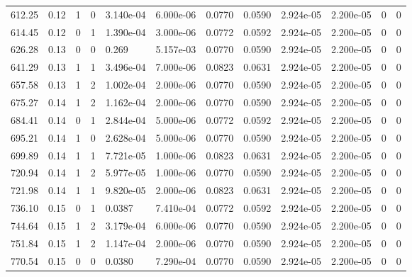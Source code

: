 \documentclass[preview]{standalone}
\begin{document}
{{\begin{tabular}{L{1.2cm}C{1.2cm} C{0.3cm}C{0.5cm} C{1.4cm}C{1.4cm} C{1.4cm}C{1.4cm} C{1.6cm}C{1.6cm} C{1.6cm}C{1.6cm}}
  612.25  &  0.12  & 1     &  0 &  3.140e-04  & 6.000e-06  &  0.0770&   0.0590& 2.924e-05 & 2.200e-05   &  0 & 0  \\ 
  614.45  &  0.12  & 0     &  1 &  1.390e-04  & 3.000e-06  &  0.0772&   0.0592& 2.924e-05 & 2.200e-05   &  0 & 0  \\ 
  626.28  &  0.13  & 0     &  0 &  0.269  & 5.157e-03  &  0.0770&   0.0590& 2.924e-05 & 2.200e-05   &  0 & 0  \\ 
  641.29  &  0.13  & 1     &  1 &  3.496e-04  & 7.000e-06  &  0.0823&   0.0631& 2.924e-05 & 2.200e-05   &  0 & 0  \\ 
  657.58  &  0.13  & 1     &  2 &  1.002e-04  & 2.000e-06  &  0.0770&   0.0590& 2.924e-05 & 2.200e-05   &  0 & 0  \\ 
  675.27  &  0.14  & 1     &  2 &  1.162e-04  & 2.000e-06  &  0.0770&   0.0590& 2.924e-05 & 2.200e-05   &  0 & 0  \\ 
  684.41  &  0.14  & 0     &  1 &  2.844e-04  & 5.000e-06  &  0.0772&   0.0592& 2.924e-05 & 2.200e-05   &  0 & 0  \\ 
  695.21  &  0.14  & 1     &  0 &  2.628e-04  & 5.000e-06  &  0.0770&   0.0590& 2.924e-05 & 2.200e-05   &  0 & 0  \\ 
  699.89  &  0.14  & 1     &  1 &  7.721e-05  & 1.000e-06  &  0.0823&   0.0631& 2.924e-05 & 2.200e-05   &  0 & 0  \\ 
  720.94  &  0.14  & 1     &  2 &  5.977e-05  & 1.000e-06  &  0.0770&   0.0590& 2.924e-05 & 2.200e-05   &  0 & 0  \\ 
  721.98  &  0.14  & 1     &  1 &  9.820e-05  & 2.000e-06  &  0.0823&   0.0631& 2.924e-05 & 2.200e-05   &  0 & 0  \\ 
  736.10  &  0.15  & 0     &  1 &  0.0387  & 7.410e-04  &  0.0772&   0.0592& 2.924e-05 & 2.200e-05   &  0 & 0  \\ 
  744.64  &  0.15  & 1     &  2 &  3.179e-04  & 6.000e-06  &  0.0770&   0.0590& 2.924e-05 & 2.200e-05   &  0 & 0  \\ 
  751.84  &  0.15  & 1     &  2 &  1.147e-04  & 2.000e-06  &  0.0770&   0.0590& 2.924e-05 & 2.200e-05   &  0 & 0  \\ 
  770.54  &  0.15  & 0     &  0 &  0.0380  & 7.290e-04  &  0.0770&   0.0590& 2.924e-05 & 2.200e-05   &  0 & 0  \\ 
\hline 
\end{tabular} 

}}
\end{document}
